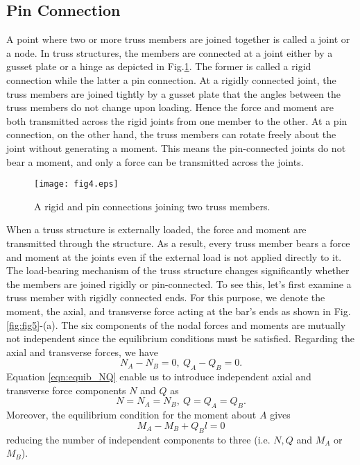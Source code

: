 ﻿\documentclass[10pt,a4j]{article}
\begin{document}
\subsection{Pin Connection}
A point where two or more truss members are joined together is called a joint or a node. In truss structures, the members are connected at a joint either by a gusset plate or a hinge as depicted in Fig.\ref{fig:fig4}. The former is called a rigid connection while the latter a pin connection. At a rigidly connected joint, the truss members are joined tightly by a gusset plate that the angles between the truss members do not change upon loading. Hence the force and moment are both transmitted across the rigid joints from one member to the other. At a pin connection, on the other hand, the truss members can rotate freely about the joint without generating a moment. This means the pin-connected joints do not bear a moment, and only a force can be transmitted across the joints. 
\begin{figure}[h]
	\begin{center}
	\texttt{[image: fig4.eps]} 
	\end{center}
	\caption{A rigid and pin connections joining two truss members.} 
	\label{fig:fig4}
\end{figure}

When a truss structure is externally loaded, the force and moment are transmitted through the structure. As a result, every truss member bears a force and moment at the joints even if the external load is not applied directly to it. The load-bearing mechanism of the truss structure changes significantly whether the members are joined rigidly or pin-connected. To see this, let's first examine a truss member with rigidly connected ends. For this purpose, we denote the moment, the axial, and transverse force acting at the bar's ends as shown in Fig.\ref{fig:fig5}-(a). The six components of the nodal forces and moments are mutually not independent since the equilibrium conditions must be satisfied.
Regarding the axial and transverse forces, we have 
\begin{equation}
	N_A-N_B=0, \ Q_A-Q_B=0.
	\label{eqn:equib_NQ}
\end{equation}
Equation \ref{eqn:equib_NQ} enable us to introduce independent axial and transverse force components 
$N$ and $Q$ as
\begin{equation}
	N=N_A=N_B,\  Q=Q_A=Q_B.
	\label{eqn:def_NQ}
\end{equation}
Moreover, the equilibrium condition for the moment about $A$ gives 
\begin{equation}
	M_A-M_B+Q_Bl=0 
	\label{eqn:equib_Mab}
\end{equation}
reducing the number of independent components to three (i.e. $N,Q$ and $M_A$ or $M_B$).\\
\end{document}
